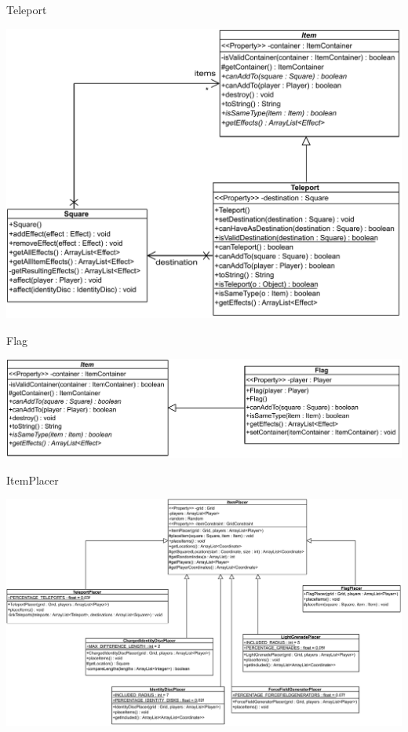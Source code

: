 \documentclass[11pt,t]{beamer}
\begin{document}
\begin{frame}{Teleport}
\begin{center}
\includegraphics[width=0.80\linewidth]{images/teleport}
\end{center}
\end{frame}

\begin{frame}{Flag}
\vspace{0.45in}
\begin{center}
\includegraphics[width=0.95\linewidth]{images/Flag}
\end{center}
\end{frame}

\begin{frame}{ItemPlacer}
\begin{center}
\includegraphics[width=0.95\linewidth]{images/itemplacer}
\end{center}
\end{frame}
\end{document}
